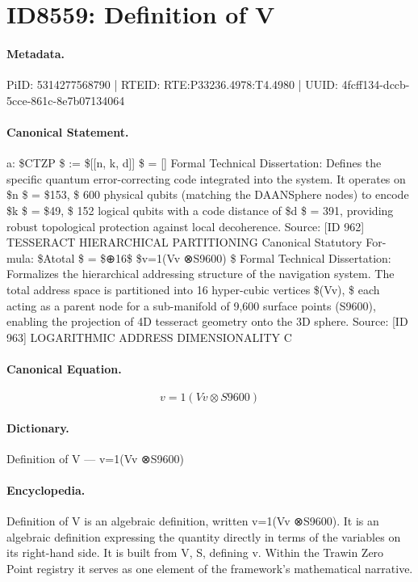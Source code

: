 \section*{ID8559: Definition of V}
\paragraph{Metadata.}
PiID: 5314277568790 | RTEID: RTE:P33236.4978:T4.4980 | UUID: 4fcff134-dccb-5cce-861c-8e7b07134064

\paragraph{Canonical Statement.}
a: \$CTZP \$ := \$[[n, k, d]] \$ = [] Formal Technical Dissertation: Defines the specific quantum error-correcting code integrated into the system. It operates on \$n \$ = \$153, \$ 600 physical qubits (matching the DAANSphere nodes) to encode \$k \$ = \$49, \$ 152 logical qubits with a code distance of \$d \$ = 391, providing robust topological protection against local decoherence. Source: [ID 962] TESSERACT HIERARCHICAL PARTITIONING Canonical Statutory For-mula: \$Atotal \$ = \$⊕16\$ \$v=1(Vv ⊗S9600) \$ Formal Technical Dissertation: Formalizes the hierarchical addressing structure of the navigation system. The total address space is partitioned into 16 hyper-cubic vertices \$(Vv), \$ each acting as a parent node for a sub-manifold of 9,600 surface points (S9600), enabling the projection of 4D tesseract geometry onto the 3D sphere. Source: [ID 963] LOGARITHMIC ADDRESS DIMENSIONALITY C

\paragraph{Canonical Equation.}
\[
v=1(Vv ⊗S9600)
\]

\paragraph{Dictionary.}
Definition of V — v=1(Vv ⊗S9600)

\paragraph{Encyclopedia.}
Definition of V is an algebraic definition, written v=1(Vv ⊗S9600). It is an algebraic definition expressing the quantity directly in terms of the variables on its right-hand side. It is built from V, S, defining v. Within the Trawin Zero Point registry it serves as one element of the framework's mathematical narrative.
